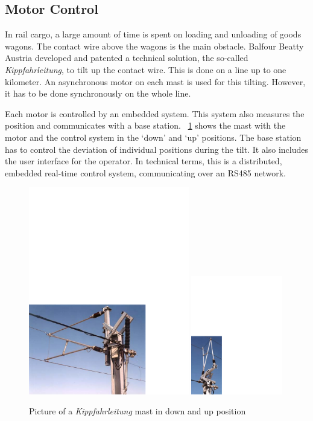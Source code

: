 \subsection{Motor Control}
\label{sec:app:kfl}

In rail cargo, a large amount of time is spent on loading and
unloading of goods wagons. The contact wire above the wagons is the
main obstacle. Balfour Beatty Austria developed and patented a
technical solution, the so-called \emph{Kippfahrleitung}, to tilt up
the contact wire. This is done on a line up to one kilometer. An
asynchronous motor on each mast is used for this tilting. However, it
has to be done synchronously on the whole line.

Each motor is controlled by an embedded system. This system also
measures the position and communicates with a base station.
\figurename~\ref{fig:results:kfl:mast} shows the mast with the motor
and the control system in the `down' and `up' positions. The base
station has to control the deviation of individual positions during
the tilt. It also includes the user interface for the operator. In
technical terms, this is a distributed, embedded real-time control
system, communicating over an RS485 network.

\begin{figure}
    \centering
    \includegraphics[width=7cm]{results/results_kfl_mast1}
    \hspace{1cm}
    \includegraphics[width=4cm]{results/results_kfl_mast2}
    \caption{Picture of a \emph{Kippfahrleitung} mast in down and up position}
    \label{fig:results:kfl:mast}
\end{figure}

